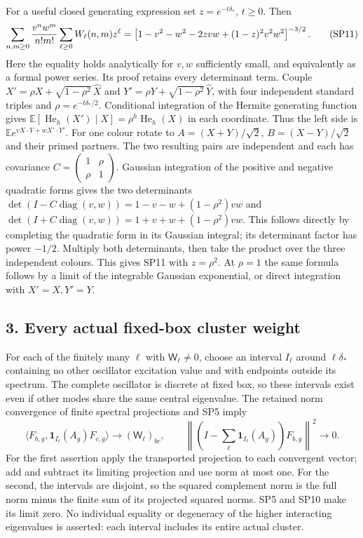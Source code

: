 \documentclass[11pt]{article}
\begin{document}
For a useful closed generating expression set \(z=e^{-t\delta_*}\), \(t\ge0\). Then
\[
 \sum_{n,m\ge0}{v^nw^m\over n!m!}
       \sum_{\ell\ge0}W_\ell(n,m)z^\ell
 =\left[1-v^2-w^2-2zvw+(1-z)^2v^2w^2\right]^{-3/2}.
 \tag{SP11}
\]
Here the equality holds analytically for \(v,w\) sufficiently small, and equivalently as a formal power series. Its proof retains every determinant term. Couple \(X' =\rho X+\sqrt{1-\rho^2}\,\widehat X\) and \(Y'=\rho Y+\sqrt{1-\rho^2}\,\widehat Y\), with four independent standard triples and \(\rho=e^{-t\delta_*/2}\). Conditional integration of the Hermite generating function gives \(\mathbb E[\operatorname{He}_h(X')\mid X]=\rho^h\operatorname{He}_h(X)\) in each coordinate. Thus the left side is \(\mathbb E e^{vX\cdot Y+wX'\cdot Y'}\).
For one colour rotate to \(A=(X+Y)/\sqrt2\), \(B=(X-Y)/\sqrt2\) and their primed partners. The two resulting pairs are independent and each has covariance \(C=\left(\begin{smallmatrix}1&\rho\\\rho&1\end{smallmatrix}\right)\). Gaussian integration of the positive and negative quadratic forms gives the two determinants
\(\det(I-C\operatorname{diag}(v,w))=1-v-w+(1-\rho^2)vw\) and
\(\det(I+C\operatorname{diag}(v,w))=1+v+w+(1-\rho^2)vw\).
This follows directly by completing the quadratic form in its Gaussian integral; its determinant factor has power \(-1/2\). Multiply both determinants, then take the product over the three independent colours. This gives SP11 with \(z=\rho^2\). At \(\rho=1\) the same formula follows by a limit of the integrable Gaussian exponential, or direct integration with \(X'=X,Y'=Y\).

\subsection*{3. Every actual fixed-box cluster weight}

For each of the finitely many \(\ell\) with \(\mathsf W_\ell\ne0\), choose an interval \(I_\ell\) around \(\ell\delta_*\) containing no other oscillator excitation value and with endpoints outside its spectrum. The complete oscillator is discrete at fixed box, so these intervals exist even if other modes share the same central eigenvalue. The retained norm convergence of finite spectral projections and SP5 imply
\[
 \langle F_{b,g},\mathbf1_{I_\ell}(A_g)F_{c,g}\rangle
       \longrightarrow(\mathsf W_\ell)_{bc},\qquad
 \left\|\left(I-\sum_\ell\mathbf1_{I_\ell}(A_g)\right)F_{b,g}\right\|^2
       \longrightarrow0.
 \tag{SP12}
\]
For the first assertion apply the transported projection to each convergent vector; add and subtract its limiting projection and use norm at most one. For the second, the intervals are disjoint, so the squared complement norm is the full norm minus the finite sum of its projected squared norms. SP5 and SP10 make its limit zero. No individual equality or degeneracy of the higher interacting eigenvalues is asserted: each interval includes its entire actual cluster.
\end{document}
